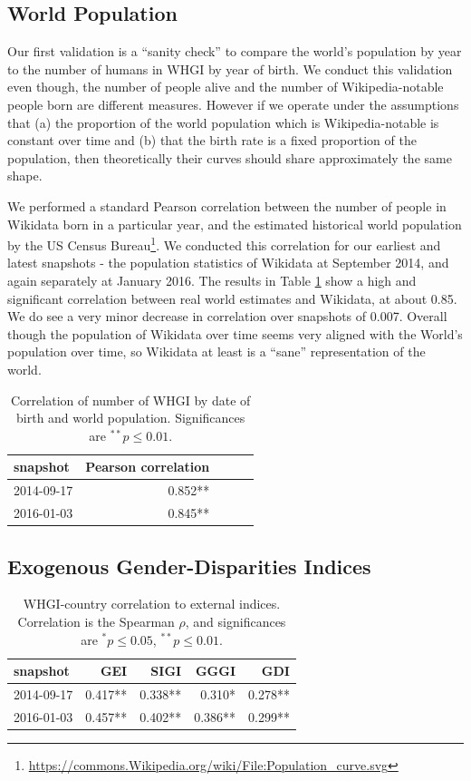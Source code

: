 \documentclass{sig-alternate-05-2015}
\begin{document}
\subsection{World Population} Our first validation is a ``sanity check'' to compare the world's population by year to the number of humans in WHGI by year of birth. We conduct this validation even though, the number of people alive and the number of Wikipedia-notable people born are different measures. However if we operate under the assumptions that (a) the proportion of the world population which is Wikipedia-notable is constant over time and (b) that the birth rate is a fixed proportion of the population, then theoretically their curves should share approximately the same shape.

We performed a standard Pearson correlation between the number of people in Wikidata born in a particular year, and the estimated historical world population by the US Census
Bureau\footnote{\url{https://commons.Wikipedia.org/wiki/File:Population_curve.svg}}.
We conducted this correlation for our earliest and latest snapshots - the population statistics of Wikidata at September 2014, and again separately at January 2016. The results in Table \ref{table:worldpop} show a high and significant correlation between real world estimates and Wikidata, at about 0.85. We do see a very minor decrease in correlation over snapshots of 0.007. Overall though the population of Wikidata over time seems very aligned with the World's population over time, so Wikidata at least is a ``sane'' representation of the world.

\begin{table}
\caption{Correlation of number of WHGI by date of birth and world population. Significances are $ ^{**}p\leq 0.01$.}
\label{table:worldpop}
\begin{tabular}{lrrrr}
\toprule
snapshot &  Pearson correlation \\
\midrule
2014-09-17 & 0.852**  \\
2016-01-03 & 0.845**  \\
\bottomrule
\end{tabular}
\end{table}

\subsection{Exogenous Gender-Disparities Indices}
\begin{table}
\caption{WHGI-country correlation to external indices. Correlation is the Spearman $\rho$, and significances are $ ^*p\leq 0.05 $, $ ^{**}p\leq 0.01$.}
\label{table:scores}
\begin{tabular}{lrrrr}
\toprule
snapshot &  GEI &  SIGI &  GGGI &  GDI  \\
\midrule
2014-09-17 &  0.417** &       0.338** &          0.310* &         0.278**  \\
2016-01-03 &  0.457** &       0.402** &          0.386** &         0.299**  \\
\bottomrule
\end{tabular}
\end{table}
\end{document}

